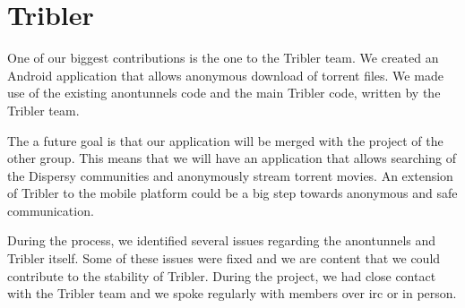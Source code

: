 \section{Tribler}
	One of our biggest contributions is the one to the Tribler team. We created an Android application that allows anonymous download of torrent files. We made use of the existing anontunnels code and the main Tribler code, written by the Tribler team.
	
	The a future goal is that our application will be merged with the project of the other group. This means that we will have an application that allows searching of the Dispersy communities and anonymously stream torrent movies. An extension of Tribler to the mobile platform could be a big step towards anonymous and safe communication.
	
	During the process, we identified several issues regarding the anontunnels and Tribler itself. Some of these issues were fixed and we are content that we could contribute to the stability of Tribler. During the project, we had close contact with the Tribler team and we spoke regularly with members over irc or in person.